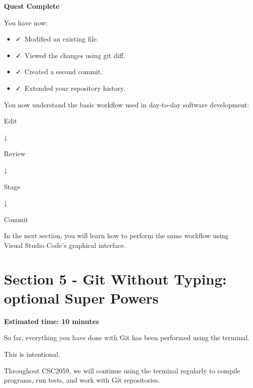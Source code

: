 \documentclass{csc2059practical}
\begin{document}
\begin{wrapupbox}
\textbf{Quest Complete}\par
\medskip

You have now:


\begin{itemize}
  \item \faCheck\ Modified an existing file.
\end{itemize}

\begin{itemize}
  \item \faCheck\ Viewed the changes using git diff.
\end{itemize}

\begin{itemize}
  \item \faCheck\ Created a second commit.
\end{itemize}

\begin{itemize}
  \item \faCheck\ Extended your repository history.
\end{itemize}

You now understand the basic workflow used in day-to-day software development:


Edit


↓


Review


↓


Stage


↓


Commit


In the next section, you will learn how to perform the same workflow using Visual Studio Code's graphical interface.


\end{wrapupbox}

\clearpage
\section{Section 5 - Git Without Typing: optional Super Powers}
\begin{infobox}
\textbf{Estimated time: 10 minutes}
\end{infobox}
So far, everything you have done with Git has been performed using the terminal.

This is intentional.

Throughout CSC2059, we will continue using the terminal regularly to compile programs, run tests, and work with Git repositories.
\end{document}
